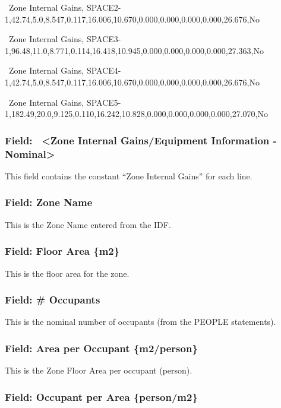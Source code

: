 ~Zone Internal Gains, SPACE2-1,42.74,5.0,8.547,0.117,16.006,10.670,0.000,0.000,0.000,0.000,26.676,No

~Zone Internal Gains, SPACE3-1,96.48,11.0,8.771,0.114,16.418,10.945,0.000,0.000,0.000,0.000,27.363,No

~Zone Internal Gains, SPACE4-1,42.74,5.0,8.547,0.117,16.006,10.670,0.000,0.000,0.000,0.000,26.676,No

~Zone Internal Gains, SPACE5-1,182.49,20.0,9.125,0.110,16.242,10.828,0.000,0.000,0.000,0.000,27.070,No

\subsubsection{Field:~ \textless{}Zone Internal Gains/Equipment Information - Nominal\textgreater{}}\label{field-zone-internal-gainsequipment-information---nominal}

This field contains the constant ``Zone Internal Gains'' for each line.

\subsubsection{Field: Zone Name}\label{field-zone-name-1}

This is the Zone Name entered from the IDF.

\subsubsection{Field: Floor Area \{m2\}}\label{field-floor-area-m2-1}

This is the floor area for the zone.

\subsubsection{Field: \# Occupants}\label{field-occupants}

This is the nominal number of occupants (from the PEOPLE statements).

\subsubsection{Field: Area per Occupant \{m2/person\}}\label{field-area-per-occupant-m2person}

This is the Zone Floor Area per occupant (person).

\subsubsection{Field: Occupant per Area \{person/m2\}}\label{field-occupant-per-area-personm2}

